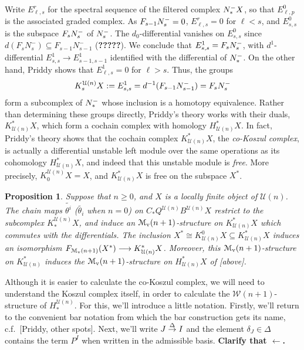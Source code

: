 \documentclass[11pt]{amsart}
\theoremstyle{plain}
\newtheorem{prop}[thm]{Proposition}
\theoremstyle{definition}
\renewcommand{\to}{\longrightarrow}
\newcommand{\calW}{\mathcal{W}}
\newcommand{\calU}{\mathcal{U}}
\newcommand{\calM}{\mathcal{M}}
\theoremstyle{plain}
\newcommand{\deltaalg}{\Delta} %
\newcommand{\produces}[3]{#3:#1\sim #2}
\renewcommand{\produces}[3]{#1\rightarrow_{#3} #2}%
\renewcommand{\produces}[3]{#1\overset{\smash{#3}}{\rightarrow} #2}%
\newcommand{\Nop}{N^{\smash{-}}}
\begin{document}
\begin{Koszul complexes}
Write $E^r_{\ell,s}$ for the spectral sequence of the filtered complex $\Nop_*X$, so that $E^0_{\ell,p}$ is the associated graded complex. As $F_{s-1} \Nop_s=0$, $E^r_{\ell,s}=0$ for $\ell<s$, and $E^0_{s,s}$ is the subspace $F_s\Nop_s$ of $\Nop_s$. The $d_0$-differential vanishes on $E^0_{s,s}$ since $d(F_sN_s^-)\subseteq F_{s-1}N_{s-1}^-$ (\textbf{?????}). We conclude that $E^1_{s,s}=F_s\Nop_s$, with $d^1$-differential $E^1_{s,s}\to E^1_{s-1,s-1}$ identified with the differential of $\Nop_*$. On the other hand, Priddy shows that $E^1_{\ell,s}=0$  for $\ell>s$. Thus, the groups
\[K_s^{\calU(n)}X:=E^1_{s,s}=d^{-1}(F_{s-1}\Nop_{s-1})=F_s\Nop_s\]
form a subcomplex of $\Nop_*$ whose inclusion is a homotopy equivalence. Rather than determining these groups directly, Priddy's theory works with their duals, $K^*_{\calU(n)}X$, which form a cochain complex with homology $H^*_{\calU(n)}X$. In fact, Priddy's theory shows that the cochain complex $K^*_{\calU(n)}X$, the \emph{co-Koszul complex}, is actually a differential unstable left module over the same operations as its cohomology $H^*_{\calU(n)}X$, and indeed that this unstable module is \emph{free}. More precisely,  $K_0^{\calU(n)}X= X$, and $K^*_{\calU(n)}X$ is free on the  subspace $X^*$.
\begin{prop}\label{the cokoszul complex is free}
Suppose that $n\geq0$, and $X$ is a locally finite object of $\calU(n)$. The chain maps $\widetilde{\theta^i}$ ($\widetilde{\theta_i}$ when $n=0$) on $C_*Q^{\calU(n)}B^{\calU(n)}X$ restrict to the subcomplex $K_*^{\calU(n)}X$, and induce an $\calM_\textup{v}(n+1)$-structure on $K^*_{\calU(n)}X$ which commutes with the differentials. The inclusion $X^*\cong K^0_{\calU(n)}X\subseteq K^*_{\calU(n)}X$ induces an isomorphism $F_{\calM_\textup{v}(n+1)}(X^*)\to K^*_{\calU(n)}X$. Moreover, this $\calM_\textup{v}(n+1)$-structure on $K^*_{\calU(n)}$ induces the $\calM_\textup{v}(n+1)$-structure on $H^*_{\calU(n)}X$ of [above]. 
\end{prop}


Although it is easier to calculate the co-Koszul complex, we will need to understand the Koszul complex itself, in order to calculate the $\calW(n+1)$-structure of $H_*^{\calU(n)}$. For this, we'll introduce a little notation. Firstly, we'll return to the convenient bar notation from which the bar construction gets its name, c.f.\ [Priddy, other spots]. Next, we'll write $\produces{J}{I}{\deltaalg}$  and the element $\delta_J\in\deltaalg$ contains the term $P^I$ when written in the admissible basis. \textbf{Clarify that $\leftarrow$.}


\end{Koszul complexes}
\end{document}
